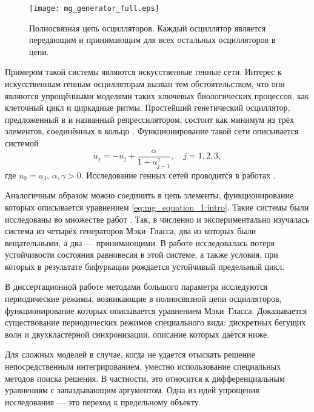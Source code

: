 \begin{figure}[ht]
	\centering
	\texttt{[image: mg\_generator\_full.eps]}
	\caption{Полносвязная цепь осцилляторов. Каждый осциллятор является передающим и принимающим для всех остальных осцилляторов в цепи.}
	\label{fig:full_mesh:intro}
\end{figure}

Примером такой системы являются искусственные генные сети. Интерес к искусственным генным осцилляторам вызван тем обстоятельством, что они являются упрощёнными моделями таких ключевых биологических процессов, как клеточный цикл и циркадные ритмы. Простейший генетический осциллятор, предложенный в \cite{Elowitz2000} и названный репрессилятором, состоит как минимум из трёх элементов, соединённых в кольцо \cite{GlyzinBook2018}. Функционирование такой сети описывается системой
\begin{equation}
	\label{eq:intro:repressilator}
	\dot{u}_j = -u_j + \dfrac{\alpha}{1 + u^{\gamma}_{j - 1}}, \quad j = 1, 2, 3,
\end{equation}
где $u_0 = u_3$, $\alpha, \gamma > 0$. Исследование генных сетей проводится в работах \cite{Likhoshvaj2003, Volokitin2004, Golubyatnikov2006, Buse2009, Buse2010}.

Аналогичным образом можно соединить в цепь элементы, функционирование которых описывается уравнением \eqref{eq:mg_equation_1:intro}. Такие системы были исследованы во множестве работ \cite{Preobrazhenskaia2021, Tateno2012, Sano2007, Wan2009}. Так, в \cite{Sano2007} численно и экспериментально изучалась система из четырёх генераторов Мэки--Гласса, два из которых были вещательными, а два --- принимающими. В работе \cite{Wan2009} исследовалась потеря устойчивости состояния равновесия в этой системе, а также условия, при которых в результате бифуркации рождается устойчивый предельный цикл.

В диссертационной работе методами большого параметра исследуются периодические режимы, возникающие в полносвязной цепи осцилляторов, функционирование которых описывается уравнением Мэки--Гласса. Доказывается существование периодических режимов специального вида: дискретных бегущих волн и двухкластерной синхронизации, описание которых даётся ниже.

{\methods} Для сложных моделей в случае, когда не удается отыскать решение непосредственным интегрированием, уместно использование специальных методов поиска решения. В частности, это относится к дифференциальным уравнениям с запаздывающим аргументом. Одна из идей упрощения исследования --- это переход к предельному объекту.

